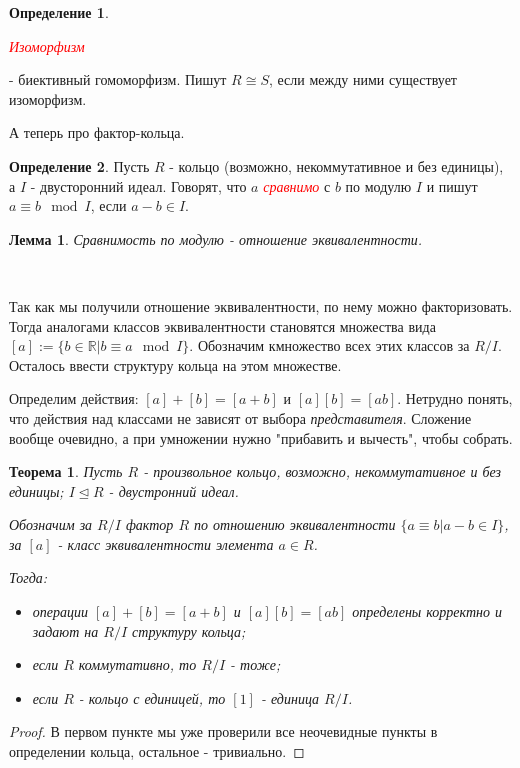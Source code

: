 \documentclass[a4paper,100pt]{article}
\theoremstyle{indented}
\newtheorem{theorem}{Теорема}
\newtheorem{lemma}{Лемма}
\theoremstyle{definition}
\newtheorem{defn}{Определение}
\theoremstyle{remark}
\begin{document}
\begin{defn}
    \hypertarget{n22}{\textcolor{red}{\textit{Изоморфизм}}} - биективный гомоморфизм. Пишут $R\cong S$, если между ними существует изоморфизм.
\end{defn}

А теперь про фактор-кольца.

\begin{defn}
    Пусть $R$ - кольцо (возможно, некоммутативное и без единицы), а $I$ - двусторонний идеал. Говорят, что $a$ \hypertarget{n23}{\textcolor{red}{\textit{сравнимо}}} с $b$ по модулю $I$ и пишут $a\equiv b \mod I$, если $a-b\in I$.
\end{defn}

\begin{lemma}
    Сравнимость по модулю - отношение эквивалентности.
\end{lemma}\

Так как мы получили отношение эквивалентности, по нему можно факторизовать. Тогда аналогами классов эквивалентности становятся множества вида $[a]:=\{b\in \mathbb{R}\vert b\equiv a \mod I\}$. Обозначим кмножество всех этих классов за $R/I$. Осталось ввести структуру кольца на этом множестве.\ 

Определим действия: $[a]+[b]=[a+b]$ и $[a][b]=[ab]$. Нетрудно понять, что действия над классами не зависят от выбора \textit{представителя}. Сложение вообще очевидно, а при умножении нужно "прибавить и вычесть",  чтобы собрать.\\

\begin{theorem}
    Пусть $R$ - произвольное кольцо, возможно, некоммутативное и без единицы; $I\trianglelefteq R$ - двустронний идеал.\ 

    Обозначим за $R/I$ фактор $R$ по отношению эквивалентности $\{a\equiv b\vert a-b\in I\}$, за $[a]$ - класс эквивалентности элемента $a\in R$.\ 

    Тогда:
    \begin{itemize}
        \item операции $[a]+[b]=[a+b]$ и $[a][b]=[ab]$ определены корректно и задают на $R/I$ структуру кольца;
        \item если $R$ коммутативно, то $R/I$ - тоже;
        \item если $R$ - кольцо с единицей, то $[1]$ - единица $R/I$.
    \end{itemize}
\end{theorem}

\begin{proof}
    В первом пункте мы уже проверили все неочевидные пункты в определении кольца, остальное - тривиально.
\end{proof}
\end{document}

